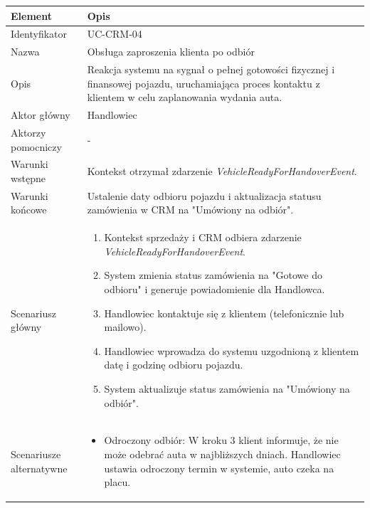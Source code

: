\begin{longtable}{|p{4cm}|p{11cm}|}
\hline
\textbf{Element} & \textbf{Opis} \\
\hline

Identyfikator & UC-CRM-04 \\
\hline

Nazwa & Obsługa zaproszenia klienta po odbiór \\
\hline

Opis & 
Reakcja systemu na sygnał o pełnej gotowości fizycznej i finansowej pojazdu, uruchamiająca proces kontaktu z klientem w celu zaplanowania wydania auta. \\
\hline

Aktor główny & Handlowiec \\
\hline

Aktorzy pomocniczy & - \\
\hline

Warunki wstępne & 
Kontekst otrzymał zdarzenie \textit{VehicleReadyForHandoverEvent}. \\
\hline

Warunki końcowe & 
Ustalenie daty odbioru pojazdu i aktualizacja statusu zamówienia w CRM na "Umówiony na odbiór". \\
\hline

Scenariusz główny & 
\begin{enumerate}
    \item Kontekst sprzedaży i CRM odbiera zdarzenie \textit{VehicleReadyForHandoverEvent}.
    \item System zmienia status zamówienia na "Gotowe do odbioru" i generuje powiadomienie dla Handlowca.
    \item Handlowiec kontaktuje się z klientem (telefonicznie lub mailowo).
    \item Handlowiec wprowadza do systemu uzgodnioną z klientem datę i godzinę odbioru pojazdu.
    \item System aktualizuje status zamówienia na "Umówiony na odbiór".
\end{enumerate} \\
\hline

Scenariusze alternatywne & 
\begin{itemize}
    \item [A1] Odroczony odbiór: W kroku 3 klient informuje, że nie może odebrać auta w najbliższych dniach. Handlowiec ustawia odroczony termin w systemie, auto czeka na placu.
\end{itemize} \\
\hline
\end{longtable}

